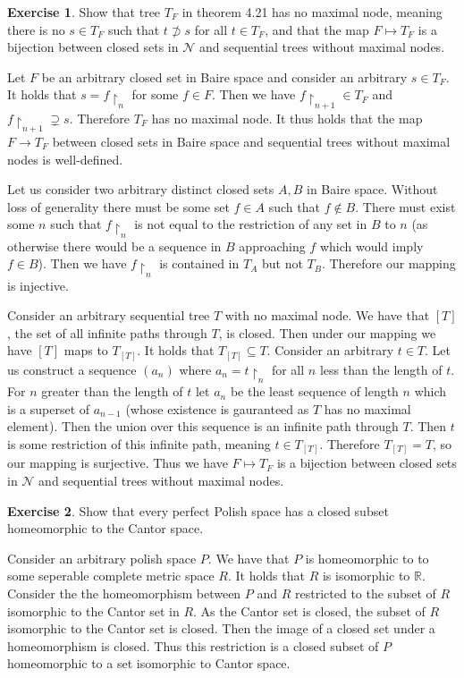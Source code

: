 \documentclass{article}
\theoremstyle{definition}
\newtheorem{exer}{Exercise}[section]
\newcommand{\R}{\mathbb{R}}
\newlength{\defparindent}
\newenvironment{answer}
    {\begin{mdframed}[backgroundcolor=gray!15, linewidth=0pt] \setlength{\parindent}{\defparindent}}
    {\end{mdframed}}
\begin{document}
\begin{exer}
    Show that tree $T_F$ in theorem 4.21 has no maximal node, meaning there is no $s \in T_F$ such that $t \not\supset s$ for all $t \in T_F$, and that the map $F \mapsto T_F$ is a bijection between closed sets in $\mathcal{N}$ and sequential trees without maximal nodes.
    \begin{answer}
        Let $F$ be an arbitrary closed set in Baire space and consider an arbitrary $s \in T_F$. It holds that $s = f\restriction_{n}$ for some $f \in F$. Then we have $f\restriction_{n + 1} \in T_F$ and $f\restriction_{n + 1} \supsetneq s$. Therefore $T_F$ has no maximal node. It thus holds that the map $F \to T_F$ between closed sets in Baire space and sequential trees without maximal nodes is well-defined. 
        
        Let us consider two arbitrary distinct closed sets $A, B$ in Baire space. Without loss of generality there must be some set $f \in A$ such that $f \not\in B$. There must exist some $n$ such that $f\restriction_{n}$ is not equal to the restriction of any set in $B$ to $n$ (as otherwise there would be a sequence in $B$ approaching $f$ which would imply $f \in B$). Then we have $f\restriction_n$ is contained in $T_A$ but not $T_B$. Therefore our mapping is injective.

        Consider an arbitrary sequential tree $T$ with no maximal node. We have that $[T]$, the set of all infinite paths through $T$, is closed. Then under our mapping we have $[T]$ maps to $T_{[T]}$. It holds that $T_{[T]} \subseteq T$. Consider an arbitrary $t \in T$. Let us construct a sequence $(a_n)$ where $a_n = t\restriction_{n}$ for all $n$ less than the length of $t$. For $n$ greater than the length of $t$ let $a_n$ be the least sequence of length $n$ which is a superset of $a_{n  - 1}$ (whose existence is gauranteed as $T$ has no maximal element). Then the union over this sequence is an infinite path through $T$. Then $t$ is some restriction of this infinite path, meaning $t \in T_{[T]}$. Therefore $T_{[T]} = T$, so our mapping is surjective. Thus we have $F \mapsto T_F$ is a bijection between closed sets in $\mathcal{N}$ and sequential trees without maximal nodes.
    \end{answer}
\end{exer}

\begin{exer}
    Show that every perfect Polish space has a closed subset homeomorphic to the Cantor space.
    \begin{answer}
        Consider an arbitrary polish space $P$. We have that $P$ is homeomorphic to to some seperable complete metric space $R$. It holds that $R$ is isomorphic to $\R$. Consider the the homeomorphism between $P$ and $R$ restricted to the subset of $R$ isomorphic to the Cantor set in $R$. As the Cantor set is closed, the subset of $R$ isomorphic to the Cantor set is closed. Then the image of a closed set under a homeomorphism is closed. Thus this restriction is a closed subset of $P$ homeomorphic to a set isomorphic to Cantor space.
    \end{answer}
\end{exer}
\end{document}
